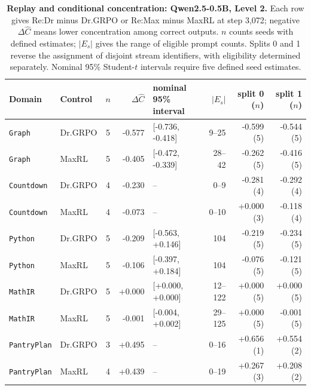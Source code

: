 \begin{table}[!htbp]
\centering
\scriptsize
\setlength{\tabcolsep}{3pt}
\begin{tabular}{@{}llcrlrrr@{}}
\toprule
Domain & Control & $n$ & $\Delta\widehat C$ & nominal 95\% interval & $|E_s|$ & split 0 ($n$) & split 1 ($n$) \\
\midrule
\texttt{Graph} & Dr.GRPO & 5 & -0.577 & [-0.736, -0.418] & 9--25 & -0.599 (5) & -0.544 (5) \\
\texttt{Graph} & MaxRL & 5 & -0.405 & [-0.472, -0.339] & 28--42 & -0.262 (5) & -0.416 (5) \\
\texttt{Countdown} & Dr.GRPO & 4 & -0.230 & -- & 0--9 & -0.281 (4) & -0.292 (4) \\
\texttt{Countdown} & MaxRL & 4 & -0.073 & -- & 0--10 & +0.000 (3) & -0.118 (4) \\
\texttt{Python} & Dr.GRPO & 5 & -0.209 & [-0.563, +0.146] & 104 & -0.219 (5) & -0.234 (5) \\
\texttt{Python} & MaxRL & 5 & -0.106 & [-0.397, +0.184] & 104 & -0.076 (5) & -0.121 (5) \\
\texttt{MathIR} & Dr.GRPO & 5 & +0.000 & [+0.000, +0.000] & 12--122 & +0.000 (5) & +0.000 (5) \\
\texttt{MathIR} & MaxRL & 5 & -0.001 & [-0.004, +0.002] & 29--125 & +0.000 (5) & -0.001 (5) \\
\texttt{PantryPlan} & Dr.GRPO & 3 & +0.495 & -- & 0--16 & +0.656 (1) & +0.554 (2) \\
\texttt{PantryPlan} & MaxRL & 4 & +0.439 & -- & 0--19 & +0.267 (3) & +0.208 (2) \\
\bottomrule
\end{tabular}
\caption{\textbf{Replay and conditional concentration: Qwen2.5-0.5B, Level 2.} Each row gives Re:Dr minus Dr.GRPO or Re:Max minus MaxRL at step 3,072; negative $\Delta\widehat C$ means lower concentration among correct outputs. $n$ counts seeds with defined estimates; $|E_s|$ gives the range of eligible prompt counts. Splits 0 and 1 reverse the assignment of disjoint stream identifiers, with eligibility determined separately. Nominal 95\% Student-$t$ intervals require five defined seed estimates.}
\end{table}

